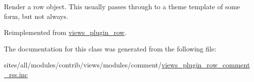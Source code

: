 Render a row object. This usually passes through to a theme template of some form, but not always. 

Reimplemented from \hyperlink{classviews__plugin__row_8243842e087dd28664b32cef0309f2a6}{views\_\-plugin\_\-row}.

The documentation for this class was generated from the following file:\begin{CompactItemize}
\item 
sites/all/modules/contrib/views/modules/comment/\hyperlink{views__plugin__row__comment__rss_8inc}{views\_\-plugin\_\-row\_\-comment\_\-rss.inc}\end{CompactItemize}
